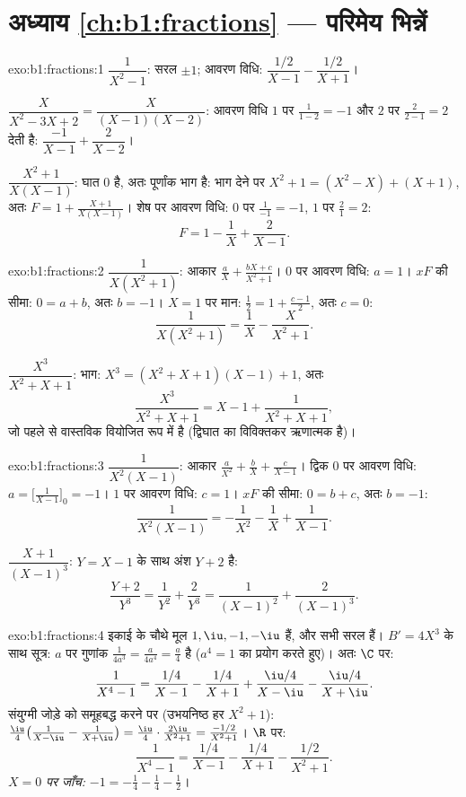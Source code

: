\section*{अध्याय \ref{ch:b1:fractions} --- परिमेय भिन्नें}

\begin{solution}{exo:b1:fractions:1}
$\dfrac{1}{X^2 - 1}$: सरल  $\pm 1$; आवरण विधि: $\dfrac{1/2}{X-1} -
\dfrac{1/2}{X+1}$।

$\dfrac{X}{X^2 - 3X + 2} = \dfrac{X}{(X-1)(X-2)}$: आवरण विधि $1$ पर
$\frac{1}{1-2} = -1$ और $2$ पर $\frac{2}{2-1} = 2$ देती है: $\dfrac{-1}{X-1}
+ \dfrac{2}{X-2}$।

$\dfrac{X^2+1}{X(X-1)}$: घात $0$ है, अतः पूर्णांक भाग है: भाग देने पर $X^2 +
1 = (X^2 - X) + (X + 1)$, अतः $F = 1 + \frac{X+1}{X(X-1)}$। शेष पर आवरण
विधि: $0$ पर $\frac{1}{-1} = -1$, $1$ पर $\frac{2}{1} = 2$:
\[
F = 1 - \frac{1}{X} + \frac{2}{X-1} .
\]
\end{solution}

\begin{solution}{exo:b1:fractions:2}
$\dfrac{1}{X(X^2+1)}$: आकार $\frac aX + \frac{bX + c}{X^2 + 1}$। $0$ पर आवरण
विधि: $a = 1$। $xF$ की सीमा: $0 = a + b$, अतः $b = -1$। $X = 1$ पर मान:
$\frac12 = 1 + \frac{c - 1}{2}$, अतः $c = 0$:
\[
\frac{1}{X(X^2+1)} = \frac 1X - \frac{X}{X^2+1} .
\]

$\dfrac{X^3}{X^2+X+1}$: भाग: $X^3 = (X^2+X+1)(X - 1) + 1$, अतः
\[
\frac{X^3}{X^2+X+1} = X - 1 + \frac{1}{X^2 + X + 1} ,
\]
जो पहले से वास्तविक वियोजित रूप में है (द्विघात का विविक्तकर ऋणात्मक है)।
\end{solution}

\begin{solution}{exo:b1:fractions:3}
$\dfrac{1}{X^2(X-1)}$: आकार $\frac{a}{X^2} + \frac bX + \frac{c}{X-1}$।
द्विक  $0$ पर आवरण विधि: $a = \bigl[\frac{1}{X-1}\bigr]_{0} = -1$। $1$
पर आवरण विधि: $c = 1$। $xF$ की सीमा: $0 = b + c$, अतः $b = -1$:
\[
\frac{1}{X^2(X-1)} = -\frac{1}{X^2} - \frac1X + \frac{1}{X-1} .
\]

$\dfrac{X+1}{(X-1)^3}$: $Y = X - 1$ के साथ अंश $Y + 2$ है:
\[
\frac{Y + 2}{Y^3} = \frac{1}{Y^2} + \frac{2}{Y^3}
= \frac{1}{(X-1)^2} + \frac{2}{(X-1)^3} .
\]
\end{solution}

\begin{solution}{exo:b1:fractions:4}
 इकाई के चौथे मूल $1, \iu, -1, -\iu$ हैं, और सभी सरल हैं। $B' = 4X^3$
के साथ  सूत्र: $a$ पर गुणांक $\frac{1}{4a^3} = \frac{a}{4a^4} =
\frac a4$ है ($a^4 = 1$ का प्रयोग करते हुए)। अतः $\C$ पर:
\[
\frac{1}{X^4 - 1}
= \frac{1/4}{X - 1} - \frac{1/4}{X + 1}
+ \frac{\iu/4}{X - \iu} - \frac{\iu/4}{X + \iu} .
\]
संयुग्मी जोड़े को समूहबद्ध करने पर (उभयनिष्ठ हर $X^2 + 1$):
$\frac{\iu}{4}\bigl(\frac{1}{X-\iu} - \frac{1}{X+\iu}\bigr) =
\frac{\iu}{4}\cdot\frac{2\iu}{X^2+1} = \frac{-1/2}{X^2+1}$। $\R$ पर:
\[
\frac{1}{X^4 - 1}
= \frac{1/4}{X-1} - \frac{1/4}{X+1} - \frac{1/2}{X^2 + 1} .
\]
\emph{$X = 0$ पर जाँच:} $-1 = -\frac14 - \frac14 - \frac12$।
\end{solution}

